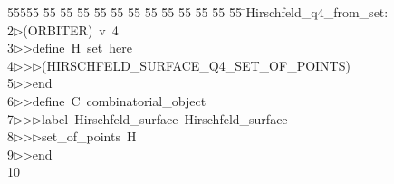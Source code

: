 %
%
\begin{tabbing}
55555 \= 55 \= 55 \= 55 \= 55 \= 55 \= 55 \= 55 \= 55 \= 55 \= 55 \= 55 \= 55 \= \>Hirschfeld\_q4\_from\_set:\\[0pt]
2\>$\triangleright$\>(ORBITER)\ v\ 4\ \\[0pt]
3\>$\triangleright$\>$\triangleright$\>define\ H\ set\ here\ \\[0pt]
4\>$\triangleright$\>$\triangleright$\>$\triangleright$\>(HIRSCHFELD\_SURFACE\_Q4\_SET\_OF\_POINTS)\ \\[0pt]
5\>$\triangleright$\>$\triangleright$\>end\ \\[0pt]
6\>$\triangleright$\>$\triangleright$\>define\ C\ combinatorial\_object\ \\[0pt]
7\>$\triangleright$\>$\triangleright$\>$\triangleright$\>label\ Hirschfeld\_surface\ Hirschfeld\_surface\ \\[0pt]
8\>$\triangleright$\>$\triangleright$\>$\triangleright$\>set\_of\_points\ H\ \\[0pt]
9\>$\triangleright$\>$\triangleright$\>end\\[0pt]
10\>\end{tabbing}
